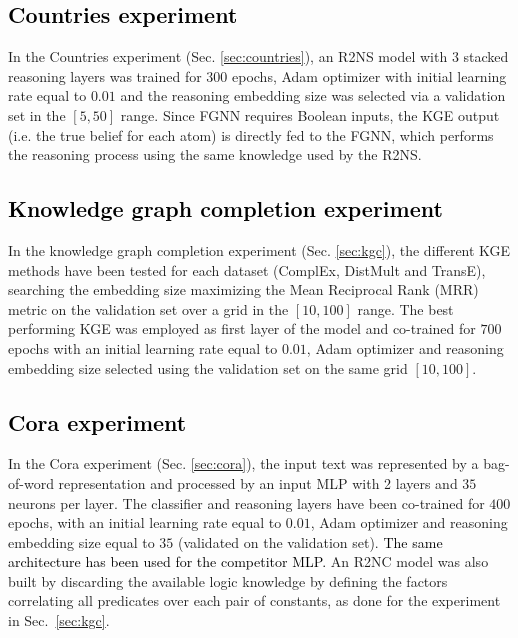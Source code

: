 \documentclass[journal]{IEEEtran}
\newcommand{\ar}[1]{\textcolor{black}{#1}}
\begin{document}
\ar{\subsection*{Countries experiment}}
In the Countries experiment (Sec. \ref{sec:countries}), an R2NS model with $3$ stacked reasoning layers was trained for $300$ epochs, Adam optimizer with initial learning rate equal to $0.01$ and the reasoning embedding size was selected via a validation set in the $[5, 50]$ range. Since FGNN requires Boolean inputs, the KGE output (i.e. the true belief for each atom) is directly fed to the FGNN, which performs the reasoning process using the same knowledge used by the R2NS. 

\ar{\subsection*{Knowledge graph completion experiment}}
In the knowledge graph completion experiment (Sec. \ref{sec:kgc}), the different KGE methods have been tested for each dataset (ComplEx, DistMult and TransE), searching the embedding size maximizing the Mean Reciprocal Rank (MRR) metric on the validation set over a grid in the $[10,100]$ range. The best performing KGE was employed as first layer of the model and co-trained for $700$ epochs with an initial learning rate equal to $0.01$, Adam optimizer and reasoning embedding size selected using the validation set on the same grid $[10,100]$.

\ar{\subsection*{Cora experiment}}
In the Cora experiment (Sec. \ref{sec:cora}),
the input text was represented by a bag-of-word representation and processed by an input MLP with 2 layers and $35$ neurons per layer. The classifier and reasoning layers have been co-trained for $400$ epochs, with an initial learning rate equal to $0.01$, Adam optimizer and reasoning embedding size equal to $35$ (validated on the validation set). \ar{The same architecture has been used for the competitor MLP.}
An R2NC model was also built by discarding the available logic knowledge by defining the factors correlating all predicates over each pair of constants, as done for the experiment in Sec.~\ref{sec:kgc}.





% 
\end{document}
